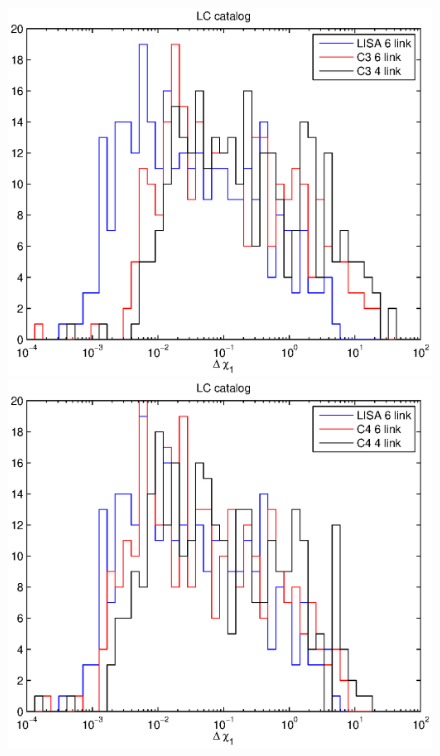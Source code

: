 \documentclass{iopart}
\begin{document}
\begin{figure}[H]
\includegraphics[scale=0.54]{FigSMBHRyanNeil/LCchi13.eps}
\includegraphics[scale=0.54]{FigSMBHRyanNeil/LCchi14.eps}

\end{figure}
\end{document}
